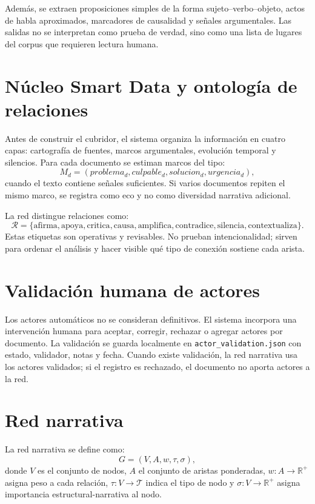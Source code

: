 \documentclass[11pt]{article}
\begin{document}
Además, se extraen proposiciones simples de la forma sujeto--verbo--objeto,
actos de habla aproximados, marcadores de causalidad y señales argumentales. Las
salidas no se interpretan como prueba de verdad, sino como una lista de lugares
del corpus que requieren lectura humana.

\section{Núcleo Smart Data y ontología de relaciones}

Antes de construir el cubridor, el sistema organiza la información en cuatro
capas: cartografía de fuentes, marcos argumentales, evolución temporal y
silencios. Para cada documento se estiman marcos del tipo:
\[
M_d=(problema_d, culpable_d, solucion_d, urgencia_d),
\]
cuando el texto contiene señales suficientes. Si varios documentos repiten el
mismo marco, se registra como eco y no como diversidad narrativa adicional.

La red distingue relaciones como:
\[
{\mathcal R}=\{
\text{afirma},\text{apoya},\text{critica},\text{causa},\text{amplifica},
\text{contradice},\text{silencia},\text{contextualiza}
\}.
\]
Estas etiquetas son operativas y revisables. No prueban intencionalidad; sirven
para ordenar el análisis y hacer visible qué tipo de conexión sostiene cada
arista.

\section{Validación humana de actores}

Los actores automáticos no se consideran definitivos. El sistema incorpora una
intervención humana para aceptar, corregir, rechazar o agregar actores por
documento. La validación se guarda localmente en \texttt{actor\_validation.json}
con estado, validador, notas y fecha. Cuando existe validación, la red narrativa
usa los actores validados; si el registro es rechazado, el documento no aporta
actores a la red.

\section{Red narrativa}

La red narrativa se define como:
\[
G=(V,A,w,\tau,\sigma),
\]
donde $V$ es el conjunto de nodos, $A$ el conjunto de aristas ponderadas,
$w:A\to \mathbb{R}^{+}$ asigna peso a cada relación, $\tau:V\to{\mathcal T}$
indica el tipo de nodo y $\sigma:V\to \mathbb{R}^{+}$ asigna importancia
estructural-narrativa al nodo.
\end{document}
